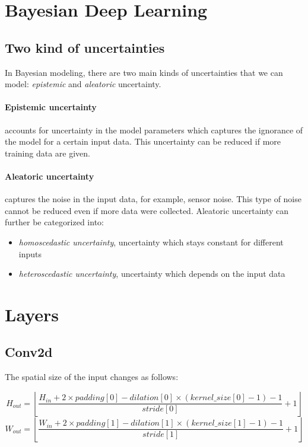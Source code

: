 \section{Bayesian Deep Learning}

\subsection{Two kind of uncertainties}
In Bayesian modeling, there are two main kinds of uncertainties that we can model: \textit{epistemic} and \textit{aleatoric} uncertainty.

\paragraph{Epistemic uncertainty} accounts for uncertainty in the model parameters which captures the ignorance of the model for a certain input data. This uncertainty can be reduced if more training data are given.

\paragraph{Aleatoric uncertainty} captures the noise in the input data, for example, sensor noise. This type of noise cannot be reduced even if more data were collected.
Aleatoric uncertainty can further be categorized into:
\begin{itemize}
    \item \textit{homoscedastic uncertainty}, uncertainty which stays constant for different inputs
    \item \textit{heteroscedastic uncertainty}, uncertainty which depends on the input data
\end{itemize}

\section{Layers}
\subsection{Conv2d}
The spatial size of the input changes as follows:

\begin{equation}
    H_{out} = \left\lfloor \frac{H_{in}+2\times padding[0] - dilation[0]\times (kernel\_size[0]-1)-1}{stride[0]}+1 \right\rfloor
\end{equation}
\begin{equation}
    W_{out} = \left\lfloor \frac{W_{in}+2\times padding[1]-dilation[1]\times(kernel\_size[1]-1)-1}{stride[1]}+1 \right\rfloor
\end{equation}

